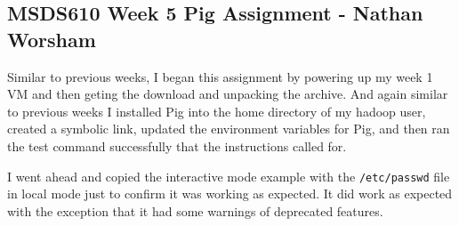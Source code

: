 \documentclass[10pt]{article}
\begin{document}
\subsection*{MSDS610 Week 5 Pig Assignment - Nathan Worsham}
Similar to previous weeks, I began this assignment by powering up my week 1 VM and then geting the download and unpacking the archive. And again similar to previous weeks I installed Pig into the home directory of my hadoop user, created a symbolic link, updated the environment variables for Pig, and then ran the test command successfully that the instructions called for. 
\par
{}%
\hfill
{}%
\par
I went ahead and copied the interactive mode example with the \verb|/etc/passwd| file in local mode just to confirm it was working as expected. It did work as expected with the exception that it had some warnings of deprecated features.
\par
{}%
\hfill
{}%
\end{document}

